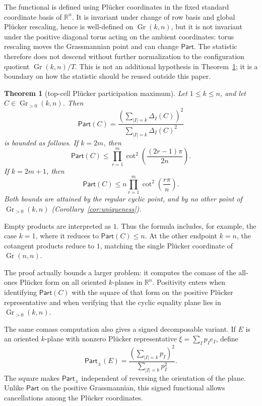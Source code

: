 \documentclass[11pt]{article}
\newtheorem{theorem}{Theorem}
\newcommand{\Gr}{\operatorname{Gr}}
\newcommand{\Part}{\mathsf{Part}}
\newcommand{\R}{\mathbb{R}}
\begin{document}
The functional is defined using Plücker coordinates in the fixed standard
coordinate basis of \(\R^n\).  It is invariant under change of row basis and
global Plücker rescaling, hence is well-defined on \(\Gr(k,n)\), but it is not
invariant under the positive diagonal torus acting on the ambient coordinates:
torus rescaling moves the Grassmannian point and can change \(\Part\).  The
statistic therefore does not descend without further normalization to the
configuration quotient \(\Gr(k,n)/T\).  This is not an additional hypothesis
in Theorem~\ref{thm:main}; it is a boundary on how the statistic should be
reused outside this paper.

\begin{theorem}[top-cell Plücker participation maximum]
\label{thm:main}
Let \(1\leq k\leq n\), and let \(C\in\Gr_{>0}(k,n)\).  Then
\[
  \Part(C)
  =
  \frac{\left(\sum_{|I|=k}\Delta_I(C)\right)^2}
       {\sum_{|I|=k}\Delta_I(C)^2}
\]
is bounded as follows.
If \(k=2m\), then
\[
  \Part(C)
  \leq
  \prod_{r=1}^{m}\cot^2\!\left(\frac{(2r-1)\pi}{2n}\right).
\]
If \(k=2m+1\), then
\[
  \Part(C)
  \leq
  n\prod_{r=1}^{m}\cot^2\!\left(\frac{r\pi}{n}\right).
\]
Both bounds are attained by the regular cyclic point, and by no other point of
\(\Gr_{>0}(k,n)\) (Corollary~\ref{cor:uniqueness}).
\end{theorem}

Empty products are interpreted as \(1\).  Thus the formula includes, for
example, the case \(k=1\), where it reduces to
\(\Part(C)\leq n\).  At the other endpoint \(k=n\), the cotangent products
reduce to \(1\), matching the single Plücker coordinate of \(\Gr(n,n)\).

The proof actually bounds a larger problem: it computes the comass of the
all-ones Plücker form on all oriented \(k\)-planes in \(\R^n\).  Positivity
enters when identifying \(\Part(C)\) with the square of that form on the
positive Plücker representative and when verifying that the cyclic equality
plane lies in \(\Gr_{>0}(k,n)\).

The same comass computation also gives a signed decomposable variant.  If
\(E\) is an oriented \(k\)-plane with nonzero Plücker representative
\(\xi=\sum_I p_Ie_I\), define
\[
  \Part_{\pm}(E)
  =
  \frac{\left(\sum_{|I|=k}p_I\right)^2}{\sum_{|I|=k}p_I^2}.
\]
The square makes \(\Part_{\pm}\) independent of reversing the orientation of
the plane.  Unlike \(\Part\) on the positive Grassmannian, this signed
functional allows cancellations among the Plücker coordinates.
\end{document}
